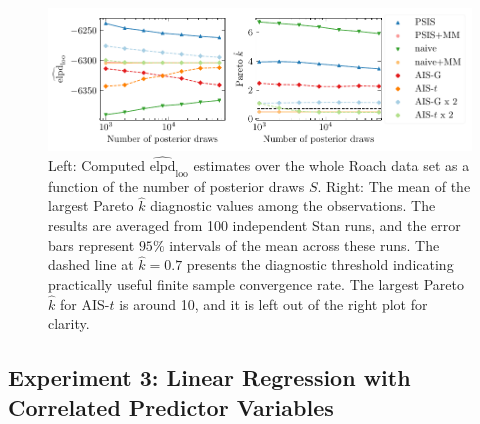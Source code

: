\documentclass[12pt]{article}
\begin{document}
\begin{figure}[t]
\centering
\includegraphics[width=\textwidth]{figs/roach_mm_ais.pdf}
\caption{Left: Computed $\widehat{\mathrm{elpd}}_{\mathrm{loo}}$
estimates over the whole Roach data set as a function of the number of posterior draws $S$. Right: The mean of the largest Pareto $\hat{k}$ diagnostic values among the observations.
The results are averaged from 100 independent Stan runs, and the error bars represent $95 \%$
intervals of the mean across these runs.
The dashed line
at $\hat{k} = 0.7$ presents the diagnostic threshold indicating practically useful finite sample convergence rate.
The largest Pareto $\hat{k}$ for AIS-$t$ is around 10, and it is left out of the right plot for clarity.} \label{fig:roach_mm_ais}
\end{figure}








\subsection{Experiment 3: Linear Regression with Correlated Predictor Variables} \label{sec:linreg}
\end{document}
